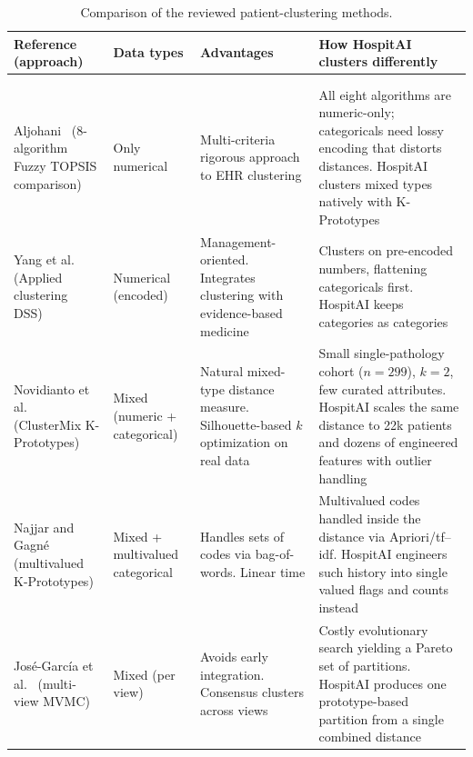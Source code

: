 \begingroup
\footnotesize
\renewcommand{\arraystretch}{1.3}
\begin{xltabular}{\textwidth}{@{}>{\raggedright\arraybackslash}p{2.7cm} >{\raggedright\arraybackslash{}\hsize}X >{\raggedright\arraybackslash{}\hsize}X >{\raggedright\arraybackslash{}\hsize}X@{}}
\toprule
\textbf{Reference (approach)} & \textbf{Data types} & \textbf{Advantages} & \textbf{How HospitAI clusters differently} \\
\midrule
\endhead
\midrule
{}\\
\endfoot
\bottomrule
\caption{Comparison of the reviewed patient-clustering methods.}\label{tab:ch3_clustering}\\
\endlastfoot
Aljohani~\cite{aljohani2024} \newline (8-algorithm Fuzzy TOPSIS comparison) &
Only numerical &
Multi-criteria rigorous approach to EHR clustering &
All eight algorithms are numeric-only; categoricals need lossy encoding that distorts distances. HospitAI clusters mixed types natively with K-Prototypes \\

Yang et al.~\cite{yang2024} \newline (Applied clustering DSS) &
Numerical (encoded) &
Management-oriented. Integrates clustering with evidence-based medicine &
Clusters on pre-encoded numbers, flattening categoricals first. HospitAI keeps categories as categories \\

Novidianto et al.~\cite{novidianto2021} \newline (ClusterMix K-Prototypes) &
Mixed (numeric + categorical) &
Natural mixed-type distance measure. Silhouette-based $k$ optimization on real data &
Small single-pathology cohort ($n{=}299$), $k{=}2$, few curated attributes. HospitAI scales the same distance to 22k patients and dozens of engineered features with outlier handling \\

Najjar and Gagné~\cite{najjar2018kproto} \newline (multivalued K-Prototypes) &
Mixed + multivalued categorical &
Handles sets of codes via bag-of-words. Linear time &
Multivalued codes handled inside the distance via Apriori/tf--idf. HospitAI engineers such history into single valued flags and counts instead \\

José-García et al.~\cite{josegarcia2022} \newline (multi-view MVMC) &
Mixed (per view) &
Avoids early integration. Consensus clusters across views &
Costly evolutionary search yielding a Pareto set of partitions. HospitAI produces one prototype-based partition from a single combined distance \\
\end{xltabular}
\endgroup

